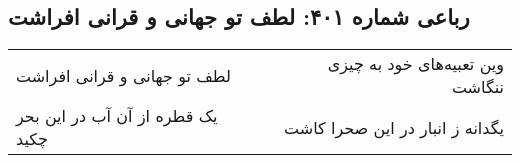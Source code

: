 \begin{center}
\section*{رباعی شماره ۴۰۱: لطف تو جهانی و قرانی افراشت}
\label{sec:0401}
\begin{longtable}{l p{0.5cm} r}
لطف تو جهانی و قرانی افراشت
&&
وین تعبیه‌های خود به چیزی ننگاشت
\\
یک قطره از آن آب در این بحر چکید
&&
یگدانه ز انبار در این صحرا کاشت
\\
\end{longtable}
\end{center}
